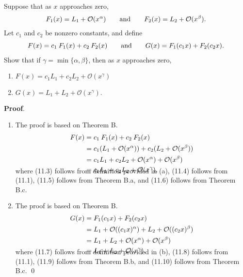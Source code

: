 \documentclass[11pt]{article}
\theoremstyle{break}
\numberwithin{equation}{theorem}
\begin{document}
\newpage
\setcounter{theorem}{10}
\renewcommand*{\thetheorem}{\arabic{theorem}}
\begin{problem}\label{problem 11}
    Suppose that as $x$ approaches zero, \vspace{-0.6em}
    \begin{equation}
        F_1(x)=L_1+\mathcal{O}(x^\alpha)\qquad\text{and}\qquad F_2(x)=L_2+\mathcal{O}(x^\beta). \vspace{-0.6em}
    \end{equation}
    Let $c_1$ and $c_2$ be nonzero constants, and define \vspace{-0.6em}
    \begin{equation}
        F(x)=c_1\:F_1(x)+c_2\:F_2(x)\qquad\text{and}\qquad G(x)=F_1(c_1x)+F_2(c_2x). \vspace{-0.6em}
    \end{equation}
    Show that if $\gamma=\min\{\alpha, \beta\}$, then as $x$ approaches zero,
    \begin{enumerate}
        \item $F(x)=c_1L_1+c_2L_2+\mathcal{O}(x^\gamma)$
        \item $G(x)=L_1+L_2+\mathcal{O}(x^\gamma)$.
    \end{enumerate}
\end{problem}
\textbf{Proof}.
\begin{enumerate}
    \item The proof is based on Theorem B. \vspace{-0.6em}
    \begin{align}
        F(x)&=c_1\:F_1(x)+c_2\:F_2(x)\\
        &=c_1(L_1+\mathcal{O}(x^\alpha))+c_2(L_2+\mathcal{O}(x^\beta))\\
        &=c_1L_1+c_2L_2+\mathcal{O}(x^\alpha)+\mathcal{O}(x^\beta)\\
        &=c_1L_1+c_2L_2+\mathcal{O}(x^\gamma),\\[-3.4em]\notag
    \end{align}
    where (11.3) follows from definition provided in (a), (11.4) follows from (11.1), (11.5) follows from Theorem B.a, and (11.6) follows from Theorem B.c.
    \item The proof is based on Theorem B. \vspace{-0.6em}
    \begin{align}
        G(x)&=F_1(c_1x)+F_2(c_2x)\\
        &=L_1+\mathcal{O}((c_1x)^\alpha)+L_2+\mathcal{O}((c_2x)^\beta)\\
        &=L_1+L_2+\mathcal{O}(x^\alpha)+\mathcal{O}(x^\beta)\\
        &=L_1+L_2+\mathcal{O}(x^\gamma),\\[-3.4em]\notag
    \end{align}
    where (11.7) follows from definition provided in (b), (11.8) follows from (11.1), (11.9) follows from Theorem B.b, and (11.10) follows from Theorem B.c. \qed
\end{enumerate}
\end{document}
